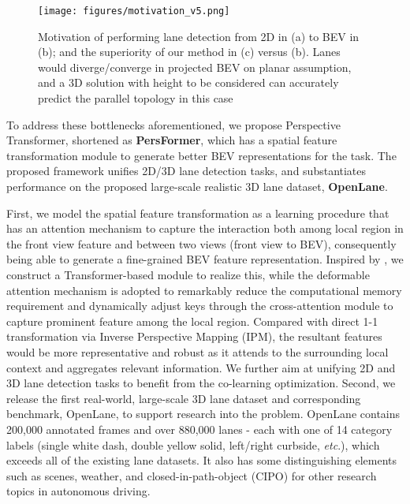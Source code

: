 \documentclass[runningheads]{llncs}
\begin{document}
\begin{figure}[t]
    \centering
    \texttt{[image: figures/motivation\_v5.png]}
\caption{Motivation of performing lane detection from {2D} in (a) to {BEV} in (b); and the superiority of our method in (c) versus (b). Lanes would diverge/converge in projected BEV on planar assumption, and a 3D solution with height to be considered can accurately predict the parallel topology in this case}
  \label{fig:motivation}
\end{figure}




To address these bottlenecks aforementioned, we propose Perspective Transformer, shortened as \textbf{PersFormer}, which has a spatial feature transformation module
to generate better BEV representations for the task.
The proposed framework
unifies 2D/3D lane detection tasks, and substantiates performance on the proposed large-scale realistic 3D lane dataset, \textbf{OpenLane}.

{First, we model the spatial feature transformation as a learning procedure that has an attention mechanism to capture the interaction both among local region in the front view feature and between two views (front view to BEV),}
consequently being able to generate a fine-grained BEV feature representation.
Inspired by \cite{vaswani2017attention,carion2020end}, we construct a Transformer-based module to realize this, while the deformable attention mechanism \cite{zhu2021deformable} is adopted to remarkably reduce the computational memory requirement and 
{dynamically adjust keys through the cross-attention module to capture prominent feature among the local region.}
{Compared with direct 1-1 transformation via Inverse Perspective Mapping (IPM), the resultant features would be more representative and robust as it attends to the surrounding local context and aggregates relevant information.}
{We further aim at unifying 2D and 3D lane detection tasks to benefit from the co-learning optimization.}
Second, we release the first real-world, large-scale 3D lane dataset and corresponding benchmark, OpenLane, to support research into the problem.
OpenLane contains 200,000 annotated frames and over 880,000 lanes - each with one of 14 category labels (single white dash, double yellow solid, left/right curbside, \textit{etc}.), which exceeds all of the existing lane datasets.
It also has some distinguishing elements such as scenes, weather, and closed-in-path-object (CIPO) for other research topics in autonomous driving.
\end{document}
